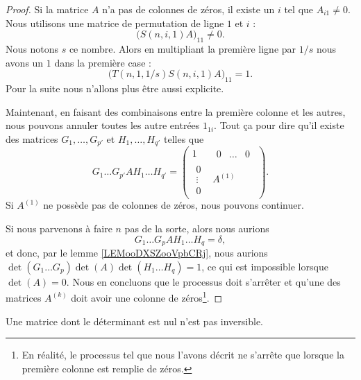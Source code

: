 \begin{proof}
	Si la matrice \( A\) n'a pas de colonnes de zéros, il existe un \( i\) tel que \( A_{i1}\neq 0\). Nous utilisons une matrice de permutation de ligne \( 1\) et \( i\) :
	\begin{equation}
		\big( S(n,i,1)A \big)_{11}\neq 0.
	\end{equation}
	Nous notons \( s\) ce nombre. Alors en multipliant la première ligne par \( 1/s\) nous avons un \( 1\) dans la première case :
	\begin{equation}
		\big( T(n,1,1/s)S(n,i,1)A \big)_{11}=1.
	\end{equation}
	Pour la suite nous n'allons plus être aussi explicite.

	Maintenant, en faisant des combinaisons entre la première colonne et les autres, nous pouvons annuler toutes les autre entrées \( 1_{1i}\). Tout ça pour dire qu'il existe des matrices \( G_1,\ldots,G_{p'}\) et \( H_1,\ldots,H_{q'}\) telles que
	\begin{equation}
		G_1\ldots G_{p'}A H_1\ldots H_{q'}=
		\begin{pmatrix}
			1              & \begin{matrix}
				                 0 & \ldots & 0
			                 \end{matrix} \\
			\begin{matrix}
				0      \\
				\vdots \\
				0
			\end{matrix} & A^{(1)}
		\end{pmatrix}.
	\end{equation}
	Si \( A^{(1)}\) ne possède pas de colonnes de zéros, nous pouvons continuer.

	Si nous parvenons à faire \( n\) pas de la sorte, alors nous aurions
	\begin{equation}
		G_1\ldots G_{p}A H_1\ldots H_{q}=\delta,
	\end{equation}
	et donc, par le lemme \ref{LEMooDXSZooVpbCRj}, nous aurions \( \det(G_1\ldots G_{p})\det(A)\det(H_1\ldots H_{q})=1\), ce qui est impossible lorsque \( \det(A)=0\). Nous en concluons que le processus doit s'arrêter et qu'une des matrices \( A^{(k)}\) doit avoir une colonne de zéros\footnote{En réalité, le processus tel que nous l'avons décrit ne s'arrête que lorsque la première colonne est remplie de zéros.}.
\end{proof}

\begin{proposition}     \label{PROPooVUDJooLWjmSI}
	Une matrice dont le déterminant est nul n'est pas inversible.
\end{proposition}

